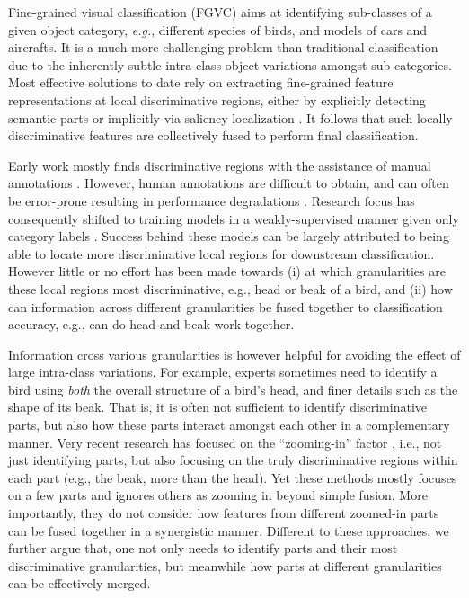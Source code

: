 \documentclass{llncs}
\begin{document}
Fine-grained visual classification (FGVC) aims at identifying sub-classes of a given object category, {\em e.g.}, different species of birds, and models of cars and aircrafts. It is a much more challenging problem than traditional classification due to the inherently subtle intra-class object variations amongst sub-categories. Most effective solutions to date rely on extracting fine-grained feature representations at local discriminative regions, either by explicitly detecting semantic parts \cite{fu2017look,zheng2017learning,yang2018learning,ge2019weakly,zhang2019learning} or implicitly via saliency localization \cite{wang2018learning,dubey2018pairwise,chen2019destruction,luo2019cross}. It follows that such locally discriminative features are collectively fused to perform final classification.

Early work mostly finds discriminative regions with the assistance of manual annotations \cite{berg2013poof,lei2016fast,xie2013hierarchical,zhang2014part,huang2016part}. However, human annotations are difficult to obtain, and can often be error-prone resulting in performance degradations \cite{zheng2017learning}. Research focus has consequently shifted to training models in a weakly-supervised manner given only category labels \cite{zheng2017learning,yang2018learning,wang2018learning,chen2019destruction}. Success behind these models can be largely attributed to being able to locate more discriminative local regions for downstream classification. However little or no effort has been made towards (i) at which granularities are these local regions most discriminative, e.g., head or beak of a bird, and (ii) how can information across different granularities be fused together to classification accuracy, e.g., can do head and beak work together. 

Information cross various granularities is however helpful for avoiding the effect of large intra-class variations. For example, experts sometimes need to identify a bird using \textit{both} the overall structure of a bird's head, and finer details such as the shape of its beak. That is, it is often not sufficient to identify discriminative parts, but also how these parts interact amongst each other in a complementary manner. Very recent research has focused on the ``zooming-in'' factor \cite{fu2017look,zhang2019learning}, i.e., not just identifying parts, but also focusing on the truly discriminative regions within each part (e.g., the beak, more than the head). Yet these methods mostly focuses on a few parts and ignores others as zooming in beyond simple fusion. More importantly, they do not consider how features from different zoomed-in parts can be fused together in a synergistic manner. Different to these approaches, we further argue that, one not only needs to identify parts and their most discriminative granularities, but meanwhile how parts at different granularities can be effectively merged.
\end{document}
